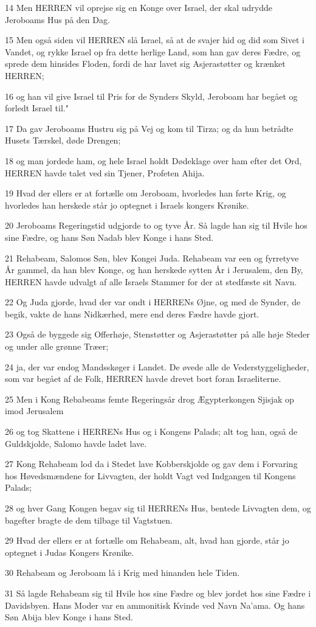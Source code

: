 \par 14 Men HERREN vil oprejse sig en Konge over Israel, der skal udrydde Jeroboams Hus på den Dag.
\par 15 Men også siden vil HERREN slå Israel, så at de svajer hid og did som Sivet i Vandet, og rykke Israel op fra dette herlige Land, som han gav deres Fædre, og sprede dem hinsides Floden, fordi de har lavet sig Asjerastøtter og krænket HERREN;
\par 16 og han vil give Israel til Pris for de Synders Skyld, Jeroboam har begået og forledt Israel til."
\par 17 Da gav Jeroboams Hustru sig på Vej og kom til Tirza; og da hun betrådte Husets Tærskel, døde Drengen;
\par 18 og man jordede ham, og hele Israel holdt Dødeklage over ham efter det Ord, HERREN havde talet ved sin Tjener, Profeten Ahija.
\par 19 Hvad der ellers er at fortælle om Jeroboam, hvorledes han førte Krig, og hvorledes han herskede står jo optegnet i Israels kongers Krønike.
\par 20 Jeroboams Regeringstid udgjorde to og tyve År. Så lagde han sig til Hvile hos sine Fædre, og hans Søn Nadab blev Konge i hans Sted.
\par 21 Rehabeam, Salomos Søn, blev Kongei Juda. Rehabeam var een og fyrretyve År gammel, da han blev Konge, og han herskede sytten År i Jerusalem, den By, HERREN havde udvalgt af alle Israels Stammer for der at stedfæste sit Navn.
\par 22 Og Juda gjorde, hvad der var ondt i HERRENs Øjne, og med de Synder, de begik, vakte de hans Nidkærhed, mere end deres Fædre havde gjort.
\par 23 Også de byggede sig Offerhøje, Stenstøtter og Asjerastøtter på alle høje Steder og under alle grønne Træer;
\par 24 ja, der var endog Mandsskøger i Landet. De øvede alle de Vederstyggeligheder, som var begået af de Folk, HERREN havde drevet bort foran Israeliterne.
\par 25 Men i Kong Rebabeams femte Regeringsår drog Ægypterkongen Sjisjak op imod Jerusalem
\par 26 og tog Skattene i HERRENs Hus og i Kongens Palads; alt tog han, også de Guldskjolde, Salomo havde ladet lave.
\par 27 Kong Rehabeam lod da i Stedet lave Kobberskjolde og gav dem i Forvaring hos Høvedsmændene for Livvagten, der holdt Vagt ved Indgangen til Kongens Palads;
\par 28 og hver Gang Kongen begav sig til HERRENs Hus, bentede Livvagten dem, og bagefter bragte de dem tilbage til Vagtstuen.
\par 29 Hvad der ellers er at fortælle om Rehabeam, alt, hvad han gjorde, står jo optegnet i Judas Kongers Krønike.
\par 30 Rehabeam og Jeroboam lå i Krig med hinanden hele Tiden.
\par 31 Så lagde Rehabeam sig til Hvile hos sine Fædre og blev jordet hos sine Fædre i Davidsbyen. Hans Moder var en ammonitisk Kvinde ved Navn Na'ama. Og hans Søn Abija blev Konge i hans Sted.

